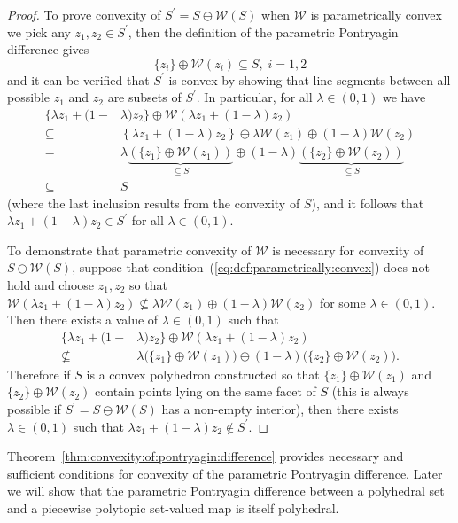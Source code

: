 \documentclass{elsarticle}
\theoremstyle{remark}
\theoremstyle{definition}
\begin{document}
\begin{proof}
To prove convexity of $S^\prime =  S\ominus \mathcal W( S)$ when $\mathcal W$ is parametrically convex we pick any $z_1,z_2\in S^\prime$, then
the definition of the parametric Pontryagin difference gives
\begin{equation}
  \{z_i\} \oplus \mathcal W(z_i) \subseteq S,\; i=1,2 
\end{equation}
%
and it can be verified that $S^\prime$ is convex by showing that line segments between all possible $z_1$ and $z_2$ are subsets of $S^\prime$. In particular, for all $\lambda \in (0,1)$ we have
\begin{align*}
  \{ \lambda z_1 + (1-&\lambda)z_2
  \}\oplus \mathcal W\left( \lambda z_1 + (1-\lambda)z_2\right)\\
  \subseteq&\left\{ \lambda z_1 + (1-\lambda)z_2
  \right\}\oplus \lambda \mathcal W(z_1) \oplus (1-\lambda)
  \mathcal W(z_2)\\
 = &\lambda\underbrace{(\{z_1\}\oplus \mathcal W(z_1))}_{\subseteq S}\oplus
  (1-\lambda)\underbrace{(\{z_2\}\oplus \mathcal W(z_2))}_{\subseteq S}\\
  \subseteq& S
\end{align*}
%
(where the last inclusion results from the convexity of $S$), and it follows that
$\lambda z_1 + (1-\lambda) z_2 \in S^\prime$ for all $\lambda \in (0,1)$. 
%

To demonstrate that parametric convexity of $\mathcal W$ is necessary for convexity of $S\ominus \mathcal W(S)$, suppose that condition~(\ref{eq:def:parametrically:convex}) does not hold and choose $z_1,z_2$ so that $\mathcal W(\lambda z_1 + (1-\lambda) z_2) \not\subseteq \lambda \mathcal W(z_1) \oplus (1-\lambda) \mathcal W (z_2)$ for some $\lambda \in (0,1)$. Then there exists a value of $\lambda\in(0,1)$ such that
\begin{align*}
  \{ \lambda z_1 + (1-&\lambda)z_2
  \}\oplus \mathcal W\left( \lambda z_1 + (1-\lambda)z_2\right)\\
 \not\subseteq &\lambda\bigl(\{z_1\}\oplus \mathcal W(z_1)\bigr)\oplus
  (1-\lambda)\bigl(\{z_2\}\oplus \mathcal W(z_2)\bigr) .
\end{align*}
Therefore if $S$ is a convex polyhedron constructed so that $\{z_1\}\oplus\mathcal W(z_1)$ and $\{z_2\}\oplus\mathcal W(z_2)$ contain points lying on the same facet of $S$ (this is always possible if $S^\prime=S\ominus \mathcal W(S)$ has a non-empty interior), then there exists $\lambda \in (0,1)$ such that $\lambda z_1 + (1-\lambda) z_2 \notin S^\prime$.
%
\end{proof}
%
Theorem~\ref{thm:convexity:of:pontryagin:difference} provides necessary and sufficient conditions for convexity of the parametric Pontryagin difference. 
%
Later we will show that the parametric Pontryagin difference between a polyhedral set and a piecewise polytopic set-valued map is itself polyhedral.
%
%
%
%
\end{document}
